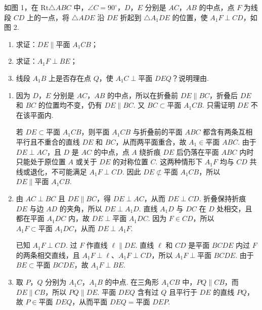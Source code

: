 \begin{problem}
如图 1，在 \(\mathrm{Rt}\triangle ABC\) 中，\(\angle C = 90^\circ\)，\(D\)，\(E\) 分别是 \(AC\)，\(AB\) 的中点，点 \(F\) 为线段 \(CD\) 上的一点，将 \(\triangle ADE\) 沿 \(DE\) 折起到 \(\triangle A_1DE\) 的位置，使 \(A_1F \perp CD\)，如图 2.

\begin{enumerate}
\item 求证：\(DE\parallel\text{平面 }A_1CB\)；
\item 求证：\(A_1F\perp BE\)；
\item 线段 \(A_1B\) 上是否存在点 \(Q\)，使 \(A_1C\perp\text{平面 }DEQ\)？说明理由.
\end{enumerate}

\begin{solution}
\begin{enumerate}
\item 因为 \(D\)，\(E\) 分别是 \(AC\)，\(AB\) 的中点，所以在折叠前 \(DE\parallel BC\)，折叠后 \(DE\) 和 \(BC\) 的位置均不变，仍有 \(DE\parallel BC\). 又 \(BC\subset\text{平面 }A_1CB\). 只需证明 \(DE\) 不在该平面内.

若 \(DE\subset\text{平面 }A_1CB\)，则平面 \(A_1CB\) 与折叠前的平面 \(ABC\) 都含有两条互相平行且不重合的直线 \(DE\) 和 \(BC\)，从而两平面重合，故 \(A_1\in\text{平面 }ABC\). 由于 \(DE\perp AC\)，且 \(D\) 是 \(AC\) 的中点，点 \(A\) 绕折痕 \(DE\) 后仍落在平面 \(ABC\) 内时只能处于原位置 \(A\) 或关于 \(DE\) 的对称位置 \(C\). 这两种情形下 \(A_1F\) 均与 \(CD\) 共线或退化，不可能满足 \(A_1F\perp CD\). 因此 \(DE\not\subset\text{平面 }A_1CB\)，所以 \(DE\parallel\text{平面 }A_1CB\).

\item 由 \(AC\perp BC\) 且 \(DE\parallel BC\)，得 \(DE\perp AC\)，从而 \(DE\perp CD\). 折叠保持折痕 \(DE\) 与边 \(AD\) 的夹角，所以 \(DE\perp A_1D\). 直线 \(A_1D\) 与 \(DC\) 在 \(D\) 处相交，且都在平面 \(A_1DC\) 内，故 \(DE\perp\text{平面 }A_1DC\). 因为 \(F\in CD\)，所以 \(A_1F\subset\text{平面 }A_1DC\)，从而 \(DE\perp A_1F\).

已知 \(A_1F\perp CD\). 过 \(F\) 作直线 \(\ell\parallel DE\). 直线 \(\ell\) 和 \(CD\) 是平面 \(BCDE\) 内过 \(F\) 的两条相交直线，且 \(A_1F\perp\ell\)、\(A_1F\perp CD\)，所以 \(A_1F\perp\text{平面 }BCDE\). 由于 \(BE\subset\text{平面 }BCDE\)，故 \(A_1F\perp BE\).

\item 取 \(P\)，\(Q\) 分别为 \(A_1C\)，\(A_1B\) 的中点. 在三角形 \(A_1CB\) 中，\(PQ\parallel CB\)，而 \(DE\parallel CB\)，所以 \(PQ\parallel DE\). 平面 \(DEQ\) 含有过 \(Q\) 且平行于 \(DE\) 的直线 \(PQ\)，故 \(P\in\text{平面 }DEQ\)，从而平面 \(DEQ=\text{平面 }DEP\).


\end{enumerate}
\end{solution}
\end{problem}
